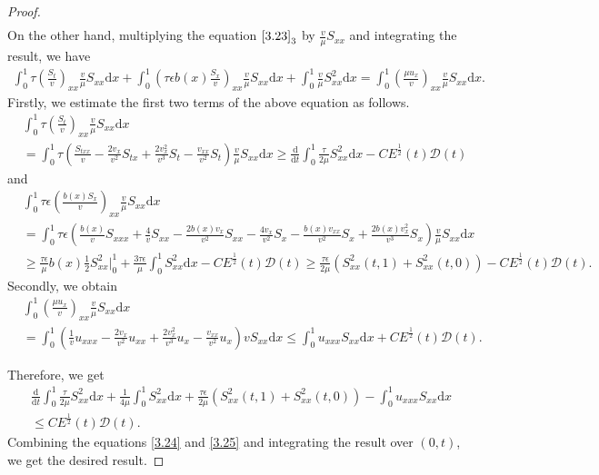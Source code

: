 \documentclass[10pt,reqno]{amsart}
\numberwithin{equation}{section}
\newcommand{\dif}{\mathrm{d}}
\begin{document}
\begin{proof}
\begin{align}
\end{align}
On the other hand, multiplying the  equation $\eqref{3.23}_3$ by $\frac{v}{\mu} S_{xx}$ and integrating the result, we have
\begin{align*}
\int_0^1 \tau \left(\frac{S_t}{v}\right)_{xx} \frac{v}{\mu} S_{xx} \dif x+\int_0^1\left( \tau\epsilon b(x) \frac{S_x}{v}\right)_{xx} \frac{v}{\mu} S_{xx}\dif x+\int_0^1 \frac{v}{\mu} S_{xx}^2 \dif x 
=\int_0^1 \left(\frac{\mu u_x}{v}\right)_{xx} \frac{v}{\mu} S_{xx} \dif x.
\end{align*}
Firstly, we  estimate the first two terms of the above equation as follows.
\begin{align*}
&\int_0^1 \tau \left(\frac{S_t}{v}\right)_{xx} \frac{v}{\mu} S_{xx}\dif x\\
&=\int_0^1 \tau \left(\frac{S_{txx}}{v}-\frac{2v_x}{v^2} S_{tx}+\frac{2v_x^2}{v^3} S_t-\frac{v_{xx}}{v^2} S_t\right) \frac{v}{\mu} S_{xx}\dif x
\ge \frac{\dif}{\dif t} \int_0^1 \frac{\tau}{2\mu} S_{xx}^2 \dif x -CE^\frac{1}{2}(t) \mathcal D(t)
\end{align*}
and
\begin{align*}
&\int_0^1 \tau \epsilon \left(\frac{b(x)S_x}{v}\right)_{xx} \frac{v}{\mu} S_{xx}\dif x \\
&=\int_0^1 \tau \epsilon \left( \frac{b(x)}{v}S_{xxx}+\frac{4}{v} S_{xx}-\frac{2 b(x) v_x}{v^2}S_{xx}-\frac{4v_x}{v^2}S_x-\frac{b(x)v_{xx}}{v^2}S_x+\frac{2 b(x)v_x^2}{v^3} S_x\right)\frac{v}{\mu} S_{xx}\dif x\\
&\ge \frac{\tau\epsilon}{\mu} b(x) \frac{1}{2} S_{xx}^2 \big|_0^1+\frac{3\tau \epsilon}{\mu}\int_0^1 S_{xx}^2 \dif x -C E^\frac{1}{2}(t)\mathcal D(t) \ge \frac{\tau\epsilon}{2\mu}(S_{xx}^2(t,1)+S_{xx}^2(t,0)) -C E^\frac{1}{2}(t)\mathcal D(t).
\end{align*}
Secondly, we obtain
\begin{align*}
&\int_0^1 \left(\frac{\mu u_x}{v}\right)_{xx} \frac{v}{\mu} S_{xx}\dif x \\
&=\int_0^1 \left(\frac{1}{v} u_{xxx}-\frac{2v_x}{v^2} u_{xx}+\frac{2v_x^2}{v^3} u_x-\frac{v_{xx}}{v^2}u_x\right) v S_{xx}\dif x \le \int_0^1 u_{xxx} S_{xx}\dif x +C E^\frac{1}{2}(t)\mathcal D(t).
\end{align*}

Therefore, we get
\begin{align}
&\frac{\dif}{\dif t} \int_0^1 \frac{\tau}{2\mu} S_{xx}^2 \dif x+\frac{1}{4\mu} \int_0^1 S_{xx}^2\dif x +\frac{\tau\epsilon}{2\mu}(S_{xx}^2(t,1)+S_{xx}^2(t,0))-\int_0^1 u_{xxx}S_{xx} \dif x \nonumber\\
&\le  C E^\frac{1}{2}(t)\mathcal D(t) . \label{3.25}
\end{align} 
Combining the equations \eqref{3.24} and \eqref{3.25} and integrating the result over $(0, t)$, we get the desired result.
\end{proof}
\end{document}
